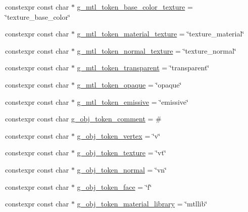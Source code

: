 \begin{DoxyCompactItemize}
constexpr const char $\ast$ \hyperlink{namespacemage_1_1rendering_1_1loader_a9e00302669eed778925141669bb55cc1}{g\+\_\+mtl\+\_\+token\+\_\+base\+\_\+color\+\_\+texture} = \char`\"{}texture\+\_\+base\+\_\+color\char`\"{}
\item 
constexpr const char $\ast$ \hyperlink{namespacemage_1_1rendering_1_1loader_aaa6c8970ee8fcc0ed3088f009d0e778d}{g\+\_\+mtl\+\_\+token\+\_\+material\+\_\+texture} = \char`\"{}texture\+\_\+material\char`\"{}
\item 
constexpr const char $\ast$ \hyperlink{namespacemage_1_1rendering_1_1loader_a13971b37d2f56dd9b4988fd85a176693}{g\+\_\+mtl\+\_\+token\+\_\+normal\+\_\+texture} = \char`\"{}texture\+\_\+normal\char`\"{}
\item 
constexpr const char $\ast$ \hyperlink{namespacemage_1_1rendering_1_1loader_a82441a9046f13d0a294d689d4a83a651}{g\+\_\+mtl\+\_\+token\+\_\+transparent} = \char`\"{}transparent\char`\"{}
\item 
constexpr const char $\ast$ \hyperlink{namespacemage_1_1rendering_1_1loader_a66314df61f846ec6712927df2583a6d9}{g\+\_\+mtl\+\_\+token\+\_\+opaque} = \char`\"{}opaque\char`\"{}
\item 
constexpr const char $\ast$ \hyperlink{namespacemage_1_1rendering_1_1loader_ad8441c4e976324ee9ded45beb738b03a}{g\+\_\+mtl\+\_\+token\+\_\+emissive} = \char`\"{}emissive\char`\"{}
\item 
constexpr const char \hyperlink{namespacemage_1_1rendering_1_1loader_a28d2091ac0bc8a30979e417ca93adfb9}{g\+\_\+obj\+\_\+token\+\_\+comment} = \textquotesingle{}\#\textquotesingle{}
\item 
constexpr const char $\ast$ \hyperlink{namespacemage_1_1rendering_1_1loader_a3bc337095a224d230c684052e246766d}{g\+\_\+obj\+\_\+token\+\_\+vertex} = \char`\"{}v\char`\"{}
\item 
constexpr const char $\ast$ \hyperlink{namespacemage_1_1rendering_1_1loader_a79a8da6ee8292a1c213462f07face729}{g\+\_\+obj\+\_\+token\+\_\+texture} = \char`\"{}vt\char`\"{}
\item 
constexpr const char $\ast$ \hyperlink{namespacemage_1_1rendering_1_1loader_a7fc2fa78dc01deb91e9b405618d1391e}{g\+\_\+obj\+\_\+token\+\_\+normal} = \char`\"{}vn\char`\"{}
\item 
constexpr const char $\ast$ \hyperlink{namespacemage_1_1rendering_1_1loader_af1e6fc3bc8207ba6113e19e01d513bce}{g\+\_\+obj\+\_\+token\+\_\+face} = \char`\"{}f\char`\"{}
\item 
constexpr const char $\ast$ \hyperlink{namespacemage_1_1rendering_1_1loader_aeed58b9cd3ff2e1424942b187c652702}{g\+\_\+obj\+\_\+token\+\_\+material\+\_\+library} = \char`\"{}mtllib\char`\"{}

\end{DoxyCompactItemize}
